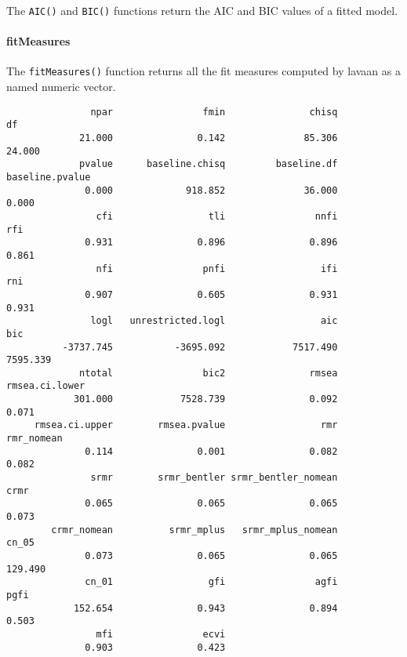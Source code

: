 The \texttt{AIC()} and \texttt{BIC()} functions return the AIC and BIC
values of a fitted model.

\hypertarget{fitmeasures}{%
\paragraph{fitMeasures}\label{fitmeasures}}

The \texttt{fitMeasures()} function returns all the fit measures
computed by lavaan as a named numeric vector.

\begin{Shaded}
\begin{Highlighting}[]
\OtherTok{\textless{}{-}} 
\end{Highlighting}
\end{Shaded}

\begin{verbatim}
               npar                fmin               chisq                  df 
             21.000               0.142              85.306              24.000 
             pvalue      baseline.chisq         baseline.df     baseline.pvalue 
              0.000             918.852              36.000               0.000 
                cfi                 tli                nnfi                 rfi 
              0.931               0.896               0.896               0.861 
                nfi                pnfi                 ifi                 rni 
              0.907               0.605               0.931               0.931 
               logl   unrestricted.logl                 aic                 bic 
          -3737.745           -3695.092            7517.490            7595.339 
             ntotal                bic2               rmsea      rmsea.ci.lower 
            301.000            7528.739               0.092               0.071 
     rmsea.ci.upper        rmsea.pvalue                 rmr          rmr_nomean 
              0.114               0.001               0.082               0.082 
               srmr        srmr_bentler srmr_bentler_nomean                crmr 
              0.065               0.065               0.065               0.073 
        crmr_nomean          srmr_mplus   srmr_mplus_nomean               cn_05 
              0.073               0.065               0.065             129.490 
              cn_01                 gfi                agfi                pgfi 
            152.654               0.943               0.894               0.503 
                mfi                ecvi 
              0.903               0.423 
\end{verbatim}

